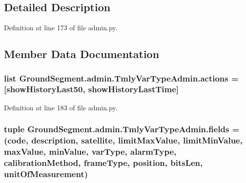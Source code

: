 \subsection{Detailed Description}


Definition at line 173 of file admin.\+py.



\subsection{Member Data Documentation}
\hypertarget{class_ground_segment_1_1admin_1_1_tmly_var_type_admin_a50f7af923ce7249b9dbffd30b1498a3f}{}
\subsubsection[{actions}]{\setlength{\rightskip}{0pt plus 5cm}list Ground\+Segment.\+admin.\+Tmly\+Var\+Type\+Admin.\+actions = \mbox{[}{\bf show\+History\+Last50}, {\bf show\+History\+Last\+Time}\mbox{]}\hspace{0.3cm}{\ttfamily [static]}}\label{class_ground_segment_1_1admin_1_1_tmly_var_type_admin_a50f7af923ce7249b9dbffd30b1498a3f}


Definition at line 183 of file admin.\+py.

\hypertarget{class_ground_segment_1_1admin_1_1_tmly_var_type_admin_aef2423842950903780b669c9d0118978}{}
\subsubsection[{fields}]{\setlength{\rightskip}{0pt plus 5cm}tuple Ground\+Segment.\+admin.\+Tmly\+Var\+Type\+Admin.\+fields = (\textquotesingle{}code\textquotesingle{}, \textquotesingle{}description\textquotesingle{}, \textquotesingle{}satellite\textquotesingle{}, \textquotesingle{}limit\+Max\+Value\textquotesingle{}, \textquotesingle{}limit\+Min\+Value\textquotesingle{}, \textquotesingle{}max\+Value\textquotesingle{}, \textquotesingle{}min\+Value\textquotesingle{}, \textquotesingle{}var\+Type\textquotesingle{}, \textquotesingle{}alarm\+Type\textquotesingle{}, \textquotesingle{}calibration\+Method\textquotesingle{}, \textquotesingle{}frame\+Type\textquotesingle{}, \textquotesingle{}position\textquotesingle{}, \textquotesingle{}bits\+Len\textquotesingle{}, \textquotesingle{}unit\+Of\+Measurement\textquotesingle{})\hspace{0.3cm}{\ttfamily [static]}}\label{class_ground_segment_1_1admin_1_1_tmly_var_type_admin_aef2423842950903780b669c9d0118978}


